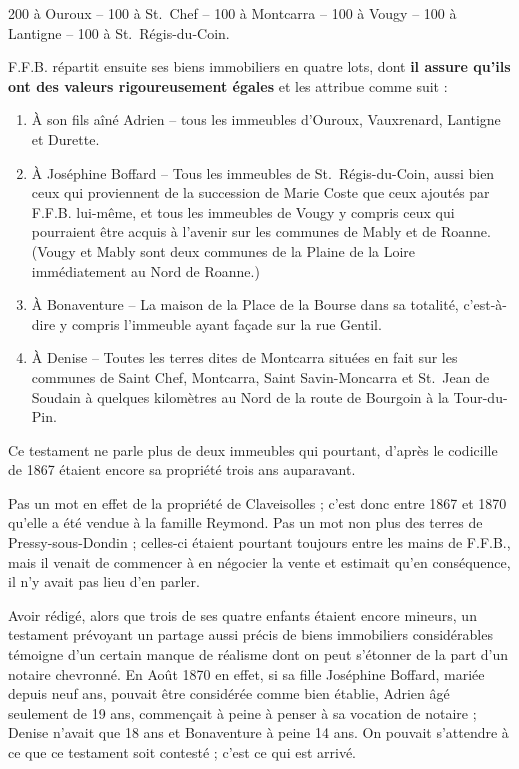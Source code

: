 \documentclass[11pt,a4paper]{report}
\providecommand{\tightlist}{\setlength{\itemsep}{0pt}\setlength{\parskip}{0pt}}
\begin{document}
200 à Ouroux -- 100 à St.~Chef -- 100 à Montcarra -- 100 à Vougy -- 100 à Lantigne -- 100 à St.~Régis-du-Coin.

F.F.B. répartit ensuite ses biens immobiliers en quatre lots, dont \textbf{il assure qu'ils ont des valeurs rigoureusement égales} et les attribue comme suit :

\begin{enumerate}
\def\labelenumi{\arabic{enumi}.}
\tightlist
\item
  À son fils aîné Adrien -- tous les immeubles d'Ouroux, Vauxrenard, Lantigne et Durette.
\item
  À Joséphine Boffard -- Tous les immeubles de St.~Régis-du-Coin, aussi bien ceux qui proviennent de la succession de Marie Coste que ceux ajoutés par F.F.B. lui-même, et tous les immeubles de Vougy y compris ceux qui pourraient être acquis à l'avenir sur les communes de Mably et de Roanne. (Vougy et Mably sont deux communes de la Plaine de la Loire immédiatement au Nord de Roanne.)
\item
  À Bonaventure -- La maison de la Place de la Bourse dans sa totalité, c'est-à-dire y compris l'immeuble ayant façade sur la rue Gentil.
\item
  À Denise -- Toutes les terres dites de Montcarra situées en fait sur les communes de Saint Chef, Montcarra, Saint Savin-Moncarra et St.~Jean de Soudain à quelques kilomètres au Nord de la route de Bourgoin à la Tour-du-Pin.
\end{enumerate}


Ce testament ne parle plus de deux immeubles qui pourtant, d'après le codicille de 1867 étaient encore sa propriété trois ans auparavant.

Pas un mot en effet de la propriété de Claveisolles ; c'est donc entre 1867 et 1870 qu'elle a été vendue à la famille Reymond. Pas un mot non plus des terres de Pressy-sous-Dondin ; celles-ci étaient pourtant toujours entre les mains de F.F.B., mais il venait de commencer à en négocier la vente et estimait qu'en conséquence, il n'y avait pas lieu d'en parler.

Avoir rédigé, alors que trois de ses quatre enfants étaient encore mineurs, un testament prévoyant un partage aussi précis de biens immobiliers considérables témoigne d'un certain manque de réalisme dont on peut s'étonner de la part d'un notaire chevronné. En Août 1870 en effet, si sa fille Joséphine Boffard, mariée depuis neuf ans, pouvait être considérée comme bien établie, Adrien âgé seulement de 19 ans, commençait à peine à penser à sa vocation de notaire ; Denise n'avait que 18 ans et Bonaventure à peine 14 ans. On pouvait s'attendre à ce que ce testament soit contesté ; c'est ce qui est arrivé.
\end{document}

